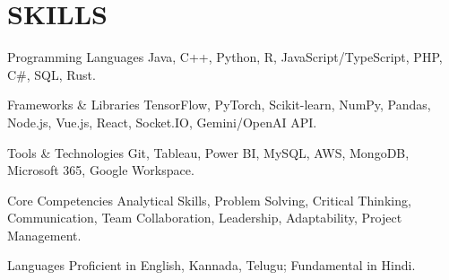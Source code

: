 \documentclass[10pt, letterpaper]{article}
\begin{document}
\vspace{\headerSpacing}

\section{SKILLS}

\vspace{\entrySpacing}
\begin{skillcategory}{Programming Languages}
  Java, C++, Python, R, JavaScript/TypeScript, PHP, C\#, SQL, Rust.
\end{skillcategory}

\vspace{\entrySpacing}
\begin{skillcategory}{Frameworks \& Libraries}
  TensorFlow, PyTorch, Scikit-learn, NumPy, Pandas, Node.js, Vue.js, React, Socket.IO, Gemini/OpenAI API.
\end{skillcategory}

\vspace{\entrySpacing}
\begin{skillcategory}{Tools \& Technologies}
  Git, Tableau, Power BI, MySQL, AWS, MongoDB, Microsoft 365, Google Workspace.
\end{skillcategory}

\vspace{\entrySpacing}
\begin{skillcategory}{Core Competencies}
  Analytical Skills, Problem Solving, Critical Thinking, Communication, Team Collaboration, Leadership, Adaptability, Project Management.
\end{skillcategory}

\vspace{\entrySpacing}
\begin{skillcategory}{Languages}
  Proficient in English, Kannada, Telugu; Fundamental in Hindi.
\end{skillcategory}

\vspace{\headerSpacing}

\end{document}
